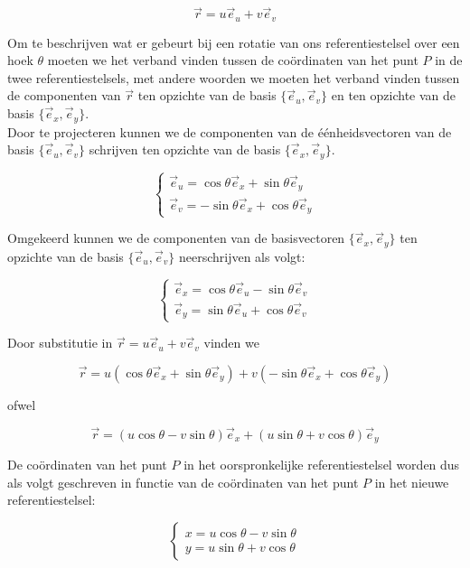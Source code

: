 \[  \vec{r}=u \vec{e}_u + v \vec{e}_v \] 

Om te beschrijven wat er gebeurt bij een rotatie van ons referentiestelsel over een hoek $\theta$ moeten we het verband vinden tussen de co\"{o}rdinaten van het punt $P$ in de twee referentiestelsels, met andere woorden we moeten het verband vinden tussen de componenten van $\vec{r}$ ten opzichte van de basis $\{\vec{e}_u ,\vec{e}_v \}$ en ten opzichte van de basis $\{\vec{e}_x ,\vec{e}_y \}$.\\ 

Door te projecteren kunnen we de componenten van de \'{e}\'{e}nheidsvectoren van de basis $\{\vec{e}_u ,\vec{e}_v \}$ schrijven ten opzichte van de basis $\{\vec{e}_x ,\vec{e}_y \}$.

\[  
\left \{ \begin{array}{l} 
\vec{e}_u =\cos \theta \vec{e}_x + \sin \theta \vec{e}_y \\
\vec{e}_v =-\sin \theta \vec{e}_x + \cos \theta \vec{e}_y
\end{array}  \right.
\]

Omgekeerd kunnen we de componenten van de basisvectoren $\{\vec{e}_x ,\vec{e}_y \}$ ten opzichte van de basis $\{\vec{e}_u ,\vec{e}_v \}$ neerschrijven als volgt:

\[  
\left \{ \begin{array}{l} 
\vec{e}_x =\cos \theta \vec{e}_u - \sin \theta \vec{e}_v \\
\vec{e}_y =\sin \theta \vec{e}_u + \cos \theta \vec{e}_v
\end{array}  \right.
\]

Door substitutie in $\vec{r}=u \vec{e}_u + v \vec{e}_v$ vinden we

\[ \vec{r}=u(\cos \theta \vec{e}_x + \sin \theta \vec{e}_y) + v(-\sin \theta \vec{e}_x + \cos \theta \vec{e}_y)  \]

ofwel

\[ \vec{r}=(u \cos \theta -v \sin \theta)\vec{e}_x + (u \sin \theta + v \cos \theta)\vec{e}_y \]

De co\"{o}rdinaten van het punt $P$ in het oorspronkelijke referentiestelsel worden dus als volgt geschreven in functie van de co\"{o}rdinaten van het punt $P$ in het nieuwe referentiestelsel:

\[   
\left\{ \begin{array}{l}
x= u \cos \theta -v \sin \theta \\
y= u \sin \theta + v \cos \theta \end{array} \right.
\]

